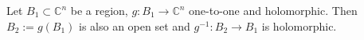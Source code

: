 Let $B_1 \subset \mathbb{C}^n$ be a region, $g: B_1 \to \mathbb{C}^n$ one-to-one and holomorphic. Then $B_2 := g(B_1)$ is also an open set and $g^{-1}: B_2 \to B_1$ is holomorphic.
